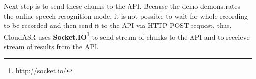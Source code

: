 Next step is to send these chunks to the API.
Because the demo demonstrates the online speech recognition mode,
  it is not possible to wait for whole recording to be recorded and then send it to the API via HTTP POST request,
  thus, CloudASR uses \textbf{Socket.IO}\footnote{\url{http://socket.io/}} to send stream of chunks to the API
  and to receieve stream of results from the API.



